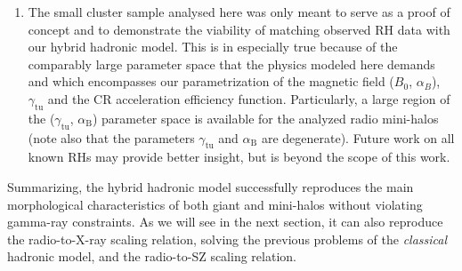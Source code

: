 \documentclass[traditabstract]{aa}
\newcommand{\rmn}{\mathrm}
\begin{document}
\begin{enumerate}
\item The small cluster sample analysed here was only meant to serve as a proof
  of concept and to demonstrate the viability of matching observed RH data with
  our hybrid hadronic model. This is in especially true because of the
  comparably large parameter space that the physics modeled here demands and
  which encompasses our parametrization of the magnetic field ($B_0$,
  $\alpha_B$), $\gamma_{\rmn{tu}}$ and the CR acceleration efficiency
  function. Particularly, a large region of the ($\gamma_{\rmn{tu}}$,
  $\alpha_{\rmn{B}}$) parameter space is available for the analyzed radio
  mini-halos (note also that the parameters $\gamma_{\rmn{tu}}$ and
  $\alpha_{\rmn{B}}$ are degenerate). Future work on all known RHs may provide
  better insight, but is beyond the scope of this work.
\end{enumerate}
Summarizing, the hybrid hadronic model successfully reproduces the main
morphological characteristics of both giant and mini-halos without violating
gamma-ray constraints. As we will see in the next section, it can also reproduce
the radio-to-X-ray scaling relation, solving the previous problems of the
\emph{classical} hadronic model, and the radio-to-SZ scaling relation. 
\end{document}
